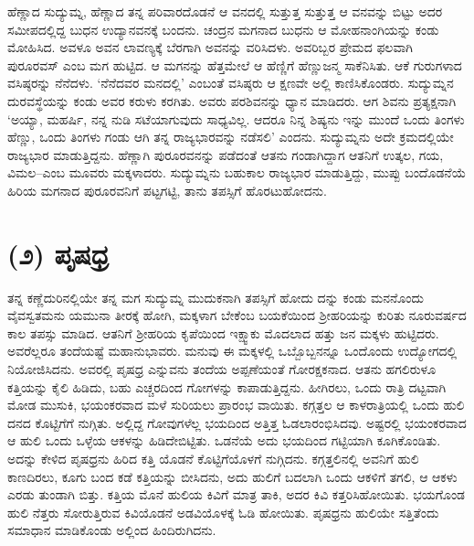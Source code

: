 ಹೆಣ್ಣಾದ ಸುದ್ಯುಮ್ನ, ಹೆಣ್ಣಾದ ತನ್ನ ಪರಿವಾರದೊಡನೆ ಆ ವನದಲ್ಲಿ ಸುತ್ತುತ್ತ ಸುತ್ತುತ್ತ ಆ ವನವನ್ನು ಬಿಟ್ಟು ಅದರ ಸಮೀಪದಲ್ಲಿದ್ದ ಬುಧನ ಉದ್ಯಾನವನಕ್ಕೆ ಬಂದನು. ಚಂದ್ರನ ಮಗನಾದ ಬುಧನು ಆ ಮೋಹನಾಂಗಿಯನ್ನು ಕಂಡು ಮೋಹಿಸಿದ. ಅವಳೂ ಅವನ ಲಾವಣ್ಯಕ್ಕೆ ಬೆರಗಾಗಿ ಅವನನ್ನು ವರಿಸಿದಳು. ಅವರಿಬ್ಬರ ಪ್ರೇಮದ ಫಲವಾಗಿ ಪುರೂರವಸ್ ಎಂಬ ಮಗ ಹುಟ್ಟಿದ. ಆ ಮಗನನ್ನು ಹೆತ್ತಮೇಲೆ ಆ ಹೆಣ್ಣಿಗೆ ಹೆಣ್ಣುಜನ್ಮ ಸಾಕೆನಿಸಿತು. ಆಕೆ ಗುರುಗಳಾದ ವಸಿಷ್ಠರನ್ನು ನೆನೆದಳು. ‘ನೆನೆದವರ ಮನದಲ್ಲಿ’ ಎಂಬಂತೆ ವಸಿಷ್ಠರು ಆ ಕ್ಷಣವೇ ಅಲ್ಲಿ ಕಾಣಿಸಿಕೊಂಡರು. ಸುದ್ಯುಮ್ನನ ದುರವಸ್ಥೆಯನ್ನು ಕಂಡು ಅವರ ಕರುಳು ಕರಗಿತು. ಅವರು ಪರಶಿವನನ್ನು ಧ್ಯಾನ ಮಾಡಿದರು. ಆಗ ಶಿವನು ಪ್ರತ್ಯಕ್ಷನಾಗಿ ‘ಅಯ್ಯಾ, ಮಹರ್ಷಿ, ನನ್ನ ನುಡಿ ಸಟೆಯಾಗುವುದು ಸಾಧ್ಯವಿಲ್ಲ. ಆದರೂ ನಿನ್ನ ಶಿಷ್ಯನು ಇನ್ನು ಮುಂದೆ ಒಂದು ತಿಂಗಳು ಹೆಣ್ಣು, ಒಂದು ತಿಂಗಳು ಗಂಡು ಆಗಿ ತನ್ನ ರಾಜ್ಯಭಾರವನ್ನು ನಡೆಸಲಿ’ ಎಂದನು. ಸುದ್ಯುಮ್ನನು ಅದೇ ಕ್ರಮದಲ್ಲಿಯೇ ರಾಜ್ಯಭಾರ ಮಾಡುತ್ತಿದ್ದನು. ಹೆಣ್ಣಾಗಿ ಪುರೂರವನನ್ನು ಪಡೆದಂತೆ ಆತನು ಗಂಡಾಗಿದ್ದಾಗ ಆತನಿಗೆ ಉತ್ಕಲ, ಗಯ, ವಿಮಲ–ಎಂಬ ಮೂವರು ಮಕ್ಕಳಾದರು. ಸುದ್ಯುಮ್ನನು ಬಹುಕಾಲ ರಾಜ್ಯಭಾರ ಮಾಡುತ್ತಿದ್ದು, ಮುಪ್ಪು ಬಂದೊಡನೆಯೆ ಹಿರಿಯ ಮಗನಾದ ಪುರೂರವನಿಗೆ ಪಟ್ಟಗಟ್ಟಿ, ತಾನು ತಪಸ್ಸಿಗೆ ಹೊರಟುಹೋದನು.


\section{(೨) ಪೃಷಧ್ರ}

ತನ್ನ ಕಣ್ಣೆದುರಿನಲ್ಲಿಯೇ ತನ್ನ ಮಗ ಸುದ್ಯುಮ್ನ ಮುದುಕನಾಗಿ ತಪಸ್ಸಿಗೆ ಹೋದು ದನ್ನು ಕಂಡು ಮನನೊಂದು ವೈವಸ್ವತಮನು ಯಮುನಾ ತೀರಕ್ಕೆ ಹೋಗಿ, ಮಕ್ಕಳಾಗ ಬೇಕೆಂಬ ಬಯಕೆಯಿಂದ ಶ್ರೀಹರಿಯನ್ನು ಕುರಿತು ನೂರುವರ್ಷದ ಕಾಲ ತಪಸ್ಸು ಮಾಡಿದ. ಆತನಿಗೆ ಶ್ರೀಹರಿಯ ಕೃಪೆಯಿಂದ ಇಕ್ಷ್ವಾಕು ಮೊದಲಾದ ಹತ್ತು ಜನ ಮಕ್ಕಳು ಹುಟ್ಟಿದರು. ಅವರೆಲ್ಲರೂ ತಂದೆಯಷ್ಟೆ ಮಹಾನುಭಾವರು. ಮನುವು ಈ ಮಕ್ಕಳಲ್ಲಿ ಒಬ್ಬೊಬ್ಬನನ್ನೂ ಒಂದೊಂದು ಉದ್ಯೋಗದಲ್ಲಿ ನಿಯೋಜಿಸಿದನು. ಅವರಲ್ಲಿ ಪೃಷಧ್ರ ಎನ್ನುವನು ತಂದೆಯ ಅಪ್ಪಣೆಯಂತೆ ಗೋರಕ್ಷಕನಾದ. ಆತನು ಹಗಲಿರುಳೂ ಕತ್ತಿಯನ್ನು ಕೈಲಿ ಹಿಡಿದು, ಬಹು ಎಚ್ಚರದಿಂದ ಗೋಗಳನ್ನು ಕಾಪಾಡುತ್ತಿದ್ದನು. ಹೀಗಿರಲು, ಒಂದು ರಾತ್ರಿ ದಟ್ಟವಾಗಿ ಮೋಡ ಮುಸುಕಿ, ಭಯಂಕರವಾದ ಮಳೆ ಸುರಿಯಲು ಪ್ರಾರಂಭ ವಾಯಿತು. ಕಗ್ಗತ್ತಲ ಆ ಕಾಳರಾತ್ರಿಯಲ್ಲಿ ಒಂದು ಹುಲಿ ದನದ ಕೊಟ್ಟಿಗೆಗೆ ನುಗ್ಗಿತು. ಅಲ್ಲಿದ್ದ ಗೋವುಗಳೆಲ್ಲ ಭಯದಿಂದ ಅತ್ತಿತ್ತ ಓಡಲಾರಂಭಿಸಿದವು. ಅಷ್ಟರಲ್ಲಿ ಭಯಂಕರವಾದ ಆ ಹುಲಿ ಒಂದು ಒಳ್ಳೆಯ ಆಕಳನ್ನು ಹಿಡಿದೇಬಿಟ್ಟಿತು. ಒಡನೆಯೆ ಅದು ಭಯದಿಂದ ಗಟ್ಟಿಯಾಗಿ ಕೂಗಿಕೊಂಡಿತು. ಅದನ್ನು ಕೇಳಿದ ಪೃಷಧ್ರನು ಹಿರಿದ ಕತ್ತಿ ಯೊಡನೆ ಕೊಟ್ಟಿಗೆಯೊಳಗೆ ನುಗ್ಗಿದನು. ಕಗ್ಗತ್ತಲಿನಲ್ಲಿ ಅವನಿಗೆ ಹುಲಿ ಕಾಣದಿರಲು, ಕೂಗು ಬಂದ ಕಡೆ ಕತ್ತಿಯನ್ನು ಬೀಸಿದನು, ಅದು ಹುಲಿಗೆ ಬದಲಾಗಿ ಒಂದು ಆಕಳಿಗೆ ತಗಲಿ, ಆ ಆಕಳು ಎರಡು ತುಂಡಾಗಿ ಬಿತ್ತು. ಕತ್ತಿಯ ಮೊನೆ ಹುಲಿಯ ಕಿವಿಗೆ ಮಾತ್ರ ತಾಕಿ, ಅದರ ಕಿವಿ ಕತ್ತರಿಸಿಹೋಯಿತು. ಭಯಗೊಂಡ ಹುಲಿ ನೆತ್ತರು ಸೋರುತ್ತಿರುವ ಕಿವಿಯೊಡನೆ ಅಡವಿಯೊಳಕ್ಕೆ ಓಡಿ ಹೋಯಿತು. ಪೃಷಧ್ರನು ಹುಲಿಯೇ ಸತ್ತಿತೆಂದು ಸಮಾಧಾನ ಮಾಡಿಕೊಂಡು ಅಲ್ಲಿಂದ ಹಿಂದಿರುಗಿದನು.

